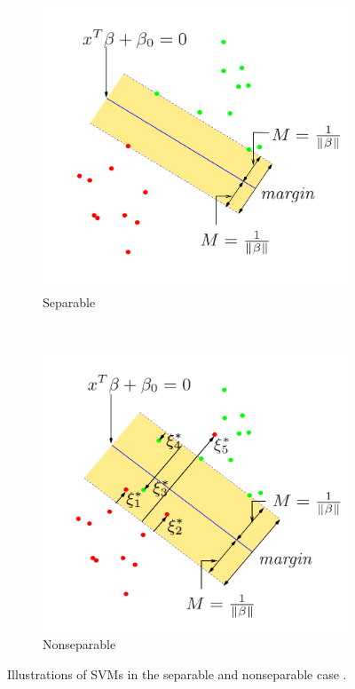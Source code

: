\begin{figure}
  \centering
  \begin{subfigure}[b]{0.48\textwidth}\centering
      \includegraphics[width=\textwidth]{figures/ml/svm_separable.png}
  \caption{Separable}
  \label{fig:svm:separable}
  \end{subfigure}
  ~
  \begin{subfigure}[b]{0.48\textwidth}\centering
      \includegraphics[width=\textwidth]{figures/ml/svm_nonseparable.png}
  \caption{Nonseparable}
  \label{fig:svm:nonseparable}
  \end{subfigure}
\caption{
Illustrations of SVMs in the separable and nonseparable case \cite{HastieTF09}.
\label{fig:svm}
}
\end{figure}

